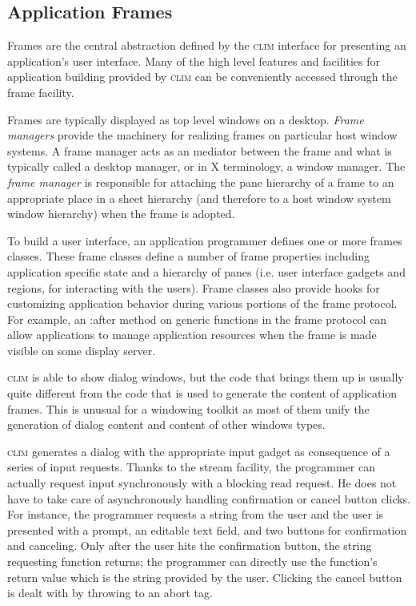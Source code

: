 \documentclass[twocolumn,a4paper]{article}
\newcommand {\concept} [1] {{\sl #1}\index{#1}}
\newcommand {\code}[1]{{\sffamily #1}}
\newcommand {\CLIM}{\textsc{clim}}
\let\keyword\code
\begin{document}
\subsection{Application Frames} 

Frames are the central abstraction defined by the \CLIM{} interface
for presenting an application's user interface. Many of the high level
features and facilities for application building provided by \CLIM{}
can be conveniently accessed through the frame facility.

Frames are typically displayed as top level windows on a desktop.
\concept{Frame managers} provide the machinery for realizing frames on
particular host window systems. A frame manager acts as an mediator
between the frame and what is typically called a desktop manager, or
in X terminology, a window manager. The \concept{frame manager} is
responsible for attaching the pane hierarchy of a frame to an
appropriate place in a sheet hierarchy (and therefore to a host window
system window hierarchy) when the frame is adopted.

To build a user interface, an application programmer defines one or
more frames classes. These frame classes define a number of frame
properties including application specific state and a hierarchy of
panes (i.e.{} user interface gadgets and regions, for interacting with
the users). Frame classes also provide hooks for customizing
application behavior during various portions of the frame protocol.
For example, an \keyword{:after} method on generic functions in the
frame protocol can allow applications to manage application resources
when the frame is made visible on some display server.

\CLIM{} is able to show dialog windows, but the code that brings them
up is usually quite different from the code that is used to generate
the content of application frames. This is unusual for a windowing
toolkit as most of them unify the generation of dialog content and
content of other windows types.

\CLIM{} generates a dialog with the appropriate input gadget as
consequence of a series of input requests. Thanks to the stream
facility, the programmer can actually request input synchronously with
a blocking read request. He does not have to take care of
asynchronously handling confirmation or cancel button clicks.  For
instance, the programmer requests a string from the user and the user
is presented with a prompt, an editable text field, and two buttons
for confirmation and canceling. Only after the user hits the
confirmation button, the string requesting function returns; the
programmer can directly use the function's return value which is the
string provided by the user. Clicking the cancel button is dealt with by throwing to an
\code{abort} tag.
\end{document}
